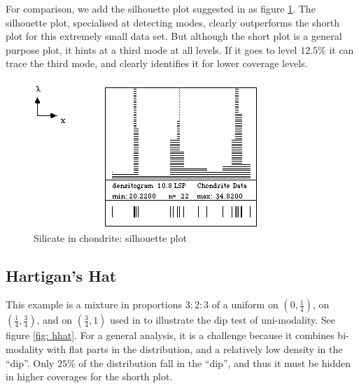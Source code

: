 \documentclass[dvips,12pt,a4paper,twoside]{amsart}
\begin{document}
For comparison, we add the silhouette plot suggested in \cite{dwmgs91jasa} as figure \ref{fig:chondritesilh}. The silhouette plot, specialised at detecting modes, clearly outperforms the shorth plot for this extremely small data set. But although the short plot is  a general purpose plot,
 it hints at a third mode at all levels. If it goes to level $12.5\%$ it can trace the third mode, and clearly identifies it for lower coverage levels.%
\begin{figure}[htb]
\includegraphics[width=0.5\linewidth]{../www/priv/graphics/excesschondrite1.jpg}

\caption{Silicate in chondrite: silhouette plot}\label{fig:chondritesilh}
\end{figure}
\clearpage
%
%
\subsection{Hartigan's Hat}
%
This example is a mixture in proportions $3:2:3$  of a uniform on $\left(0,\frac{1}{4}\right)$, on $\left(\frac{1}{4}, \frac{3}{4} \right)$, and on $\left(\frac{3}{4}, 1 \right)$ used in \cite{Hartigan1985The-dip-test-of} to illustrate the dip test of uni-modality. See figure \ref{fig: hhat}. For a general analysis, it is a challenge because it combines bi-modality with flat parts in the distribution, and a relatively low density in the ``dip''. Only $25\%$ of the distribution fall in the ``dip'', and thus it must be hidden in higher coverages for the shorth plot.
\end{document}
